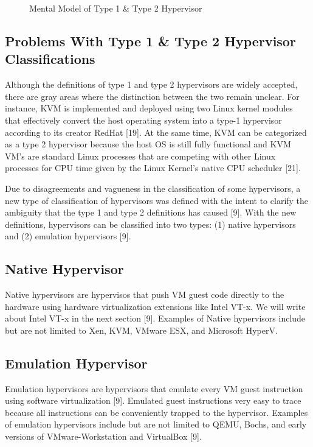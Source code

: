 \documentclass{report}
\begin{document}
\begin{spacing}{1.5}
\begin{figure}[ht]
  \caption{Mental Model of Type 1 \& Type 2 Hypervisor}
\end{figure}


\subsection{Problems With Type 1 \& Type 2 Hypervisor Classifications}

{\large
Although the definitions of type 1 and type 2 hypervisors are widely accepted, there are gray areas where the distinction between the two remain unclear. For instance, KVM is implemented and deployed using two Linux kernel modules that effectively convert the host operating system into a type-1 hypervisor according to its creator RedHat [19]. At the same time, KVM can be categorized as a type 2 hypervisor because the host OS is still fully functional and KVM VM's are standard Linux processes that are competing with other Linux processes for CPU time given by the Linux Kernel's native CPU scheduler [21].
\newline
}


{\large
Due to disagreements and vagueness in the classification of some hypervisors, a new type of classification of hypervisors was defined with the intent to clarify the ambiguity that the type 1 and type 2 definitions has caused [9]. With the new definitions, hypervisors can be classified into two types: (1) native hypervisors and (2) emulation hypervisors [9].
\newline
}

\subsection{Native Hypervisor}

{\large
Native hypervisors are hypervisos that push VM guest code directly to the hardware using hardware virtualization extensions like Intel VT-x. We will write about Intel VT-x in the next section [9]. Examples of Native hypervisors include but are not limited to Xen, KVM, VMware ESX, and Microsoft HyperV.
\newline
}


\subsection{Emulation Hypervisor}
{\large
Emulation hypervisors are hypervisors that emulate every VM guest instruction using software virtualization [9]. Emulated guest instructions very easy to trace because all instructions can be conveniently trapped to the hypervisor. Examples of emulation hypervisors include but are not limited to  QEMU, Bochs, and early versions of VMware-Workstation and VirtualBox [9].
\newline
}











\end{spacing}
\end{document}
